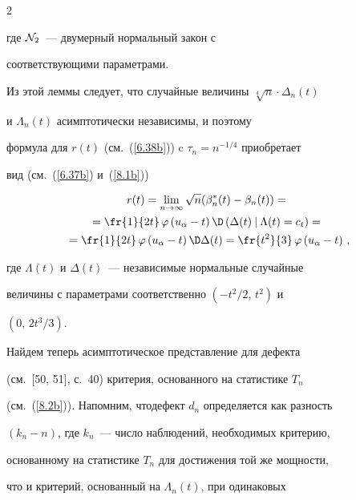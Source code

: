 \begin{multicols}{2}
{где ${\cal N}_2$~--- двумерный нормальный закон с


соответствующими параметрами. }





Из этой леммы следует, что случайные величины $\sqrt[4] n \cdot \Delta_n(t)$ 


и $\Lambda_n(t)$ асимптотически независимы, и поэтому


формула для $r(t)$ (см.~(\ref{6.38b})) c $\tau_n=n^{-1/4}$ приобретает


вид (см.~(\ref{6.37b}) и~(\ref{8.1b}))


\begin{multline}


r(t)=\lim_{n \to \infty}{\sqrt n(\beta_n^*(t)-\beta_n(t))}= {}\\


=\fr{1}{2t}\,\varphi\left (


u_{\alpha}-t \right ) \D\left (


\Delta(t)\:|\:\Lambda(t)=c_t\right )={}\\


{}=\fr{1}{2t}\,\varphi\left (u_{\alpha}-t\right )


\D\Delta(t)= \fr{t^2}{3}\,\varphi\left (


u_{\alpha}-t\right )\,,


\label{8.10b}


\end{multline}


где $\Lambda(t)$ и $\Delta(t)$~--- независимые нормальные случайные


величины с параметрами соответственно $(-t^2/2,\,t^2)$ и


$(0,\,2t^3/3)$.





Найдем теперь асимптотическое представление для дефекта


(см.~[50, 51], с.~40) критерия, основанного на статистике $T_n$


(см.~(\ref{8.2b})). Напомним, что\linebreak дефект $d_n$ определяется как разность


$(k_n-n)$, где $k_n$~--- число наблюдений, необходимых критерию,


основанному на статистике $T_n$ для достижения той же мощности,


что и критерий, основанный на $\Lambda_n(t)$, при одинаковых



\end{multicols}
